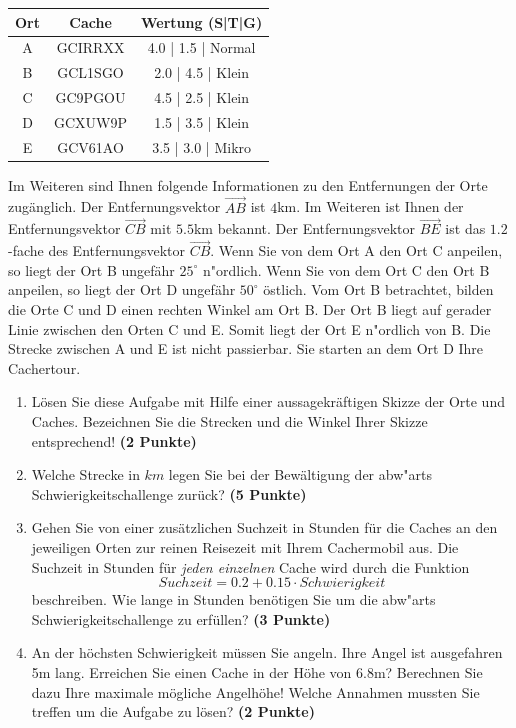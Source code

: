 \documentclass[a4paper, 9pt]{scrartcl}\usepackage[]{graphicx}\usepackage[]{xcolor}
\begin{document}
\begin{center}
  \begin{tabular}{ ccc }
    \toprule
    Ort & Cache & Wertung (S|T|G) \\
    \midrule
    A & GCIRRXX & 4.0 | 1.5 | Normal \\
    B & GCL1SGO & 2.0 | 4.5 | Klein \\ 
    C & GC9PGOU & 4.5 | 2.5 | Klein \\ 
    D & GCXUW9P & 1.5 | 3.5 | Klein \\ 
    E & GCV61AO & 3.5 | 3.0 | Mikro \\     
 \bottomrule
\end{tabular}
\end{center}

Im Weiteren sind Ihnen folgende Informationen zu den Entfernungen der Orte
zug{\"a}nglich. Der Entfernungsvektor $\overrightarrow{AB}$ ist
$4$km. Im Weiteren ist Ihnen der Entfernungsvektor
$\overrightarrow{CB}$ mit $5.5$km bekannt. Der
Entfernungsvektor $\overrightarrow{BE}$ ist das $1.2$-fache
des Entfernungsvektor $\overrightarrow{CB}$. Wenn Sie von dem Ort A den Ort
C anpeilen, so liegt der Ort B ungef{\"a}hr $25^\circ$
n{"o}rdlich. Wenn Sie von dem Ort C den Ort B anpeilen, so liegt
der Ort D ungef{\"a}hr $50^\circ$ {\"o}stlich. Vom Ort B
betrachtet, bilden die Orte C und D einen rechten Winkel am Ort B. Der Ort
B liegt auf gerader Linie zwischen den Orten C und E. Somit liegt der Ort E
n{"o}rdlich von B. Die Strecke zwischen A und E ist nicht
passierbar. Sie starten an dem Ort D Ihre Cachertour. \\

\begin{enumerate}
\item L{\"o}sen Sie diese Aufgabe mit Hilfe einer aussagekr{\"a}ftigen Skizze der
  Orte und Caches. Bezeichnen Sie die Strecken und die Winkel Ihrer Skizze
  entsprechend! \textbf{(2 Punkte)}
\item Welche Strecke in $km$ legen Sie bei der Bew{\"a}ltigung der
  abw{"a}rts Schwierigkeitschallenge zur{\"u}ck? \textbf{(5
    Punkte)}
\item Gehen Sie von einer zus{\"a}tzlichen Suchzeit in Stunden f{\"u}r die
  Caches an den jeweiligen Orten zur reinen Reisezeit mit Ihrem Cachermobil
  aus. Die Suchzeit in Stunden f{\"u}r \textit{jeden einzelnen} Cache wird durch die
  Funktion
  \begin{equation*}
    Suchzeit = 0.2 + 0.15 \cdot Schwierigkeit
  \end{equation*}  
  beschreiben.  Wie lange in Stunden ben{\"o}tigen Sie um die
  abw{"a}rts Schwierigkeitschallenge zu erf{\"u}llen? \textbf{(3 Punkte)}
\item An der h{\"o}chsten Schwierigkeit m{\"u}ssen Sie angeln. Ihre Angel ist
  ausgefahren 5m lang. Erreichen Sie einen Cache in der H{\"o}he
  von 6.8m?  Berechnen Sie dazu Ihre maximale m{\"o}gliche
  Angelh{\"o}he! Welche Annahmen mussten Sie treffen um die Aufgabe zu l{\"o}sen? \textbf{(2 Punkte)} 
\end{enumerate}
\end{document}
